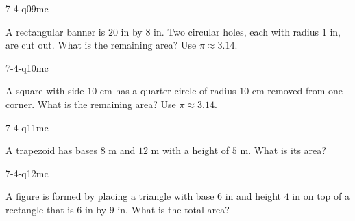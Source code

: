 \begin{practiceQuestion}{7-4-q09}{mc}
\begin{questionText}
A rectangular banner is $20$ in by $8$ in. Two circular holes, each with radius $1$ in, are cut out. What is the remaining area? Use $\pi \approx 3.14$.
\end{questionText}
\end{practiceQuestion}

\begin{practiceQuestion}{7-4-q10}{mc}
\begin{questionText}
A square with side $10$ cm has a quarter-circle of radius $10$ cm removed from one corner. What is the remaining area? Use $\pi \approx 3.14$.
\end{questionText}
\end{practiceQuestion}

\begin{practiceQuestion}{7-4-q11}{mc}
\begin{questionText}
A trapezoid has bases $8$ m and $12$ m with a height of $5$ m. What is its area?
\end{questionText}
\end{practiceQuestion}

\begin{practiceQuestion}{7-4-q12}{mc}
\begin{questionText}
A figure is formed by placing a triangle with base $6$ in and height $4$ in on top of a rectangle that is $6$ in by $9$ in. What is the total area?
\end{questionText}
\end{practiceQuestion}

